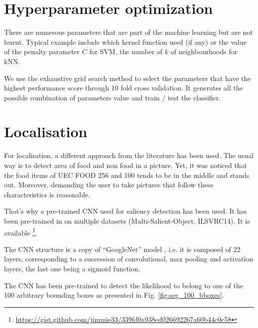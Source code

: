 \section{Hyperparameter optimization}

There are numerous parameters that are part of the machine learning but are not learnt. Typical example include which kernel function used (if any) or the value of the penalty parameter $C$ for SVM, the number of $k$ of neighbourhoods for kNN.

We use the exhaustive grid search method to select the parameters that have the highest performance score through 10 fold cross validation. It generates all the possible combination of parameters value and train / test the classifier.

\section{Localisation}

For localisation, a different approach from the literature has been used. The usual way is to detect area of food and non food in a picture. Yet, it was noticed that the food items of UEC FOOD 256 and 100 tends to be in the middle and stands out. Moreover, demanding the user to take pictures that follow these characteristics is reasonable.

That's why a pre-trained CNN used for saliency detection has been used. It has been pre-trained in \cite{zhang2015SOD} on multiple datasets (Multi-Salient-Object, ILSVRC14). It is available \footnote{\url{https://gist.github.com/jimmie33/339fd0a938ed026692267a60b44c0c58}}.

The CNN structure is a copy of \enquote{GoogleNet} model \cite{Szegedy2015}, i.e. it is composed of 22 layers, corresponding to a succession of convolutional, max pooling and activation layers, the last one being a sigmoid function.

The CNN has been pre-trained to detect the likelihood to belong to one of the 100 arbitrary bounding boxes as presented in Fig. \ref{fig:seg_100_bboxes}.

